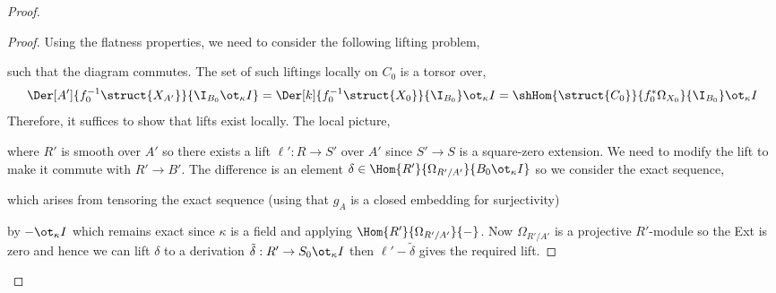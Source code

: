 \documentclass[12pt]{article}
\begin{document}
\begin{proof}
\begin{proof}
Using the flatness properties, we need to consider the following lifting problem,
\begin{center}
\end{center}
such that the diagram commutes. The set of such liftings locally on $C_0$ is a torsor over,
\[ \Der[A']{f_0^{-1} \struct{X_{A'}}}{\I_{B_0} \ot_\kappa I} = \Der[k]{f_0^{-1} \struct{X_0}}{\I_{B_0}} \ot_\kappa I = \shHom{\struct{C_0}}{f_0^* \Omega_{X_0}}{\I_{B_0}} \ot_\kappa I \]
Therefore, it suffices to show that lifts exist locally. The local picture,
\begin{center}
\end{center}
where $R'$ is smooth over $A'$ so there exists a lift $\ell' : R \to S'$ over $A'$ since $S' \to S$ is a square-zero extension. We need to modify the lift to make it commute with $R' \to B'$. The difference is an element $\delta \in \Hom{R'}{\Omega_{R'/A'}}{B_0 \ot_\kappa I}$  
so we consider the exact sequence,
\begin{center}
\end{center}
which arises from tensoring the exact sequence (using that $g_A$ is a closed embedding for surjectivity)
\begin{center}
\end{center}
by $- \ot_\kappa I$ which remains exact since $\kappa$ is a field and applying $\Hom{R'}{\Omega_{R'/A'}}{-}$. Now $\Omega_{R'/A'}$ is a projective $R'$-module so the Ext is zero and hence we can lift $\delta$ to a derivation $\tilde{\delta} : R' \to S_0 \ot_\kappa I$ then $\ell' - \tilde{\delta}$ gives the required lift. 
\end{proof}


\end{proof}
\end{document}
